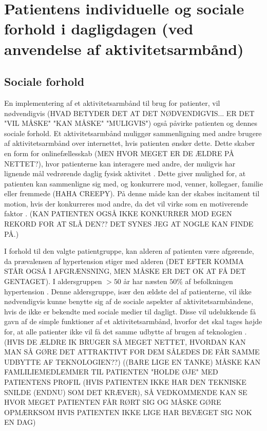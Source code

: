 \section{Patientens individuelle og sociale forhold i dagligdagen (ved anvendelse af aktivitetsarmbånd)}
\subsection{Sociale forhold}
En implementering af et aktivitetsarmbånd til brug for patienter, vil nødvendigvis (HVAD BETYDER DET AT DET NØDVENDIGVIS... ER DET "VIL MÅSKE" "KAN MÅSKE" "MULIGVIS") også påvirke patienten og dennes sociale forhold. Et aktivitetsarmbånd muliggør sammenligning med andre brugere af aktivitetsarmbånd over internettet, hvis patienten ønsker dette. Dette skaber en form for onlinefællesskab (MEN HVOR MEGET ER DE ÆLDRE PÅ NETTET?), hvor patienterne kan interagere med andre, der muligvis har lignende mål vedrørende daglig fysisk aktivitet \citep{karapanos2016}. 
Dette giver mulighed for, at patienten kan sammenligne sig med, og konkurrere mod, venner, kollegaer, familie eller fremmede (HAHA CREEPY). På denne måde kan der skabes incitament til motion, hvis der konkurreres mod andre, da det vil virke som en motiverende faktor \citep{rooksby2014}. (KAN PATIENTEN OGSÅ IKKE KONKURRER MOD EGEN REKORD FOR AT SLÅ DEN?? DET SYNES JEG AT NOGLE KAN FINDE PÅ.) 

I forhold til den valgte patientgruppe, kan alderen af patienten være afgørende, da prævalensen af hypertension stiger med alderen (DET EFTER KOMMA STÅR OGSÅ I AFGRÆNSNING, MEN MÅSKE ER DET OK AT FÅ DET GENTAGET). I aldersgruppen $>50$ år har næsten $50 \%$ af befolkningen hypertension \citep{kronborg2008}. Denne aldersgruppe, især den ældste del af patienterne, vil ikke nødvendigvis kunne benytte sig af de sociale aspekter af aktivitetsarmbåndene, hvis de ikke er bekendte med sociale medier til dagligt. Disse vil udelukkende få gavn af de simple funktioner af et aktivitetsarmbånd, hvorfor det skal tages højde for, at alle patienter ikke vil få det samme udbytte af brugen af teknologien \citep{mercer2016}. (HVIS DE ÆLDRE IK BRUGER SÅ MEGET NETTET, HVORDAN KAN MAN SÅ GØRE DET ATTRAKTIVT FOR DEM SÅLEDES DE FÅR SAMME UDBYTTE AF TEKNOLOGIEN??)
((BARE LIGE EN TANKE) MÅSKE KAN FAMLILIEMEDLEMMER TIL PATIENTEN "HOLDE ØJE" MED PATIENTENS PROFIL (HVIS PATIENTEN IKKE HAR DEN TEKNISKE SNILDE (ENDNU) SOM DET KRÆVER), SÅ VEDKOMMENDE KAN SE HVOR MEGET PATIENTEN FÅR RØRT SIG OG MÅSKE GØRE OPMÆRKSOM HVIS PATIENTEN IKKE LIGE HAR BEVÆGET SIG NOK EN DAG)

